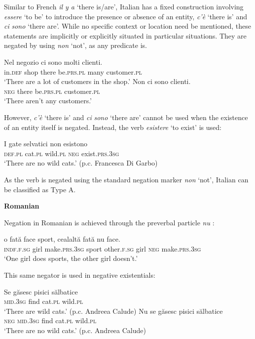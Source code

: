 \documentclass[output=paper]{langsci/langscibook}
\begin{document}
\begin{unindented}
Similar to French \textit{il y a} `there is/are', Italian has a fixed construction involving \textit{essere} `to be' to introduce the presence or absence of an entity, \textit{c’è} `there is' and \textit{ci} \textit{sono} `there are'. While no specific context or location need be mentioned, these statements are implicitly or explicitly situated in particular situations. They are negated by using \textit{non} `not', as any predicate is. 
%
\begin{exe}\ex \gll
Nel negozio ci sono molti clienti.  \\
in.\textsc{def} shop there be.\textsc{prs.pl} many customer.\textsc{pl} \\
    \glt `There are a lot of customers in the shop.'  \citet[32]{PeyronelHiggins2006}
\ex \gll Non ci sono clienti.  \\
\textsc{neg} there be.\textsc{prs.pl} customer.\textsc{pl} \\
    \glt `There aren't any customers.' \citet[33]{PeyronelHiggins2006}
    \end{exe}

However, \textit{c’è} `there is' and \textit{ci} \textit{sono} `there are' cannot be used when the existence of an entity itself is negated. Instead, the verb \textit{esistere} `to exist' is used:
%
\begin{exe}\ex \gll I gate selvatici non esistono \\
\textsc{def.pl} cat.\textsc{pl} wild.\textsc{pl} \textsc{neg} exist.\textsc{prs.3sg} \\
    \glt `There are no wild cats.' (p.c. Francesca Di Garbo)
    \end{exe} 

As the verb is negated using the standard negation marker \textit{non} `not', Italian can be classified as Type A.  

\textbf{Romanian}

Negation in Romanian is achieved through the preverbal particle \textit{nu}
\parencite[see][]{Gonczol2008}:
%
\begin{exe}\ex \gll o fată face sport, cealaltă fată nu face.  \\
\textsc{indf.f.sg} girl make.\textsc{prs.3sg} sport other.\textsc{f.sg} girl \textsc{neg} make.\textsc{prs.3sg} \\
    \glt `One girl does sports, the other girl doesn't.' \parencite[36]{Gonczol2008}
    \end{exe}

This same negator is used in negative existentials:
%
\begin{exe}\ex \gll Se găsesc pisici sălbatice   \\
\textsc{mid.3sg} find cat.\textsc{pl} wild.\textsc{pl} \\
    \glt `There are wild cats.' (p.c. Andreea Calude)
\ex \gll Nu se găsesc pisici sălbatice \\
\textsc{neg} \textsc{mid.3sg} find cat.\textsc{pl} wild.\textsc{pl} \\
    \glt `There are no wild cats.' (p.c. Andreea Calude)
    \end{exe}


\end{unindented}
\end{document}
